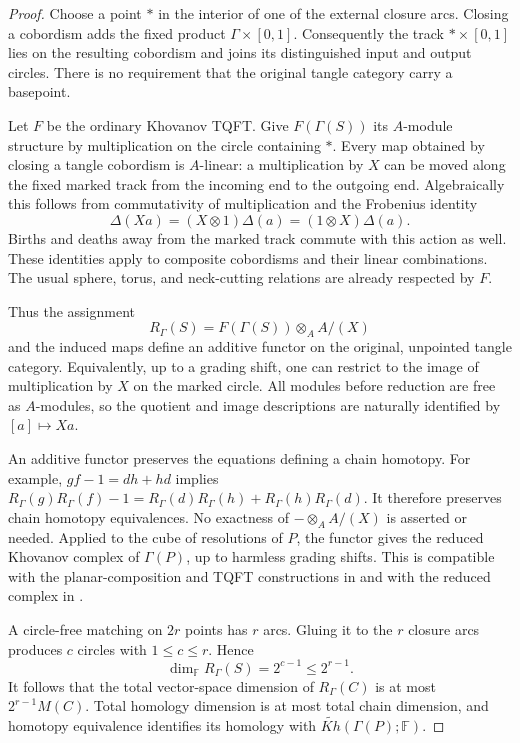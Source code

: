 \documentclass[11pt,a4paper]{article}
\theoremstyle{definition}
\theoremstyle{remark}
\numberwithin{equation}{section}
\begin{document}
\begin{proof}
Choose a point $*$ in the interior of one of the external closure arcs.
Closing a cobordism adds the fixed product $\Gamma\times[0,1]$.
Consequently the track $*\times[0,1]$ lies on the resulting cobordism
and joins its distinguished input and output circles.  There is no
requirement that the original tangle category carry a basepoint.

Let $F$ be the ordinary Khovanov TQFT.  Give $F(\Gamma(S))$ its
$A$-module structure by multiplication on the circle containing $*$.
Every map obtained by closing a tangle cobordism is $A$-linear: a
multiplication by $X$ can be moved along the fixed marked track from the
incoming end to the outgoing end.  Algebraically this follows from
commutativity of multiplication and the Frobenius identity
\[
 \Delta(Xa)=(X\otimes1)\Delta(a)
             =(1\otimes X)\Delta(a).
\]
Births and deaths away from the marked track commute with this action
as well.  These identities apply to composite cobordisms and their
linear combinations.  The usual sphere, torus, and neck-cutting
relations are already respected by $F$.

Thus the assignment
\[
 R_\Gamma(S)=F(\Gamma(S))\otimes_A A/(X)
\]
and the induced maps define an additive functor on the original,
unpointed tangle category.  Equivalently, up to a grading shift, one
can restrict to the image of multiplication by $X$ on the marked
circle.  All modules before reduction are free as $A$-modules, so
the quotient and image descriptions are naturally identified by
\mbox{$[a]\mapsto Xa$}.

An additive functor preserves the equations defining a chain homotopy.
For example, $gf-1=dh+hd$ implies
$R_\Gamma(g)R_\Gamma(f)-1
=R_\Gamma(d)R_\Gamma(h)+R_\Gamma(h)R_\Gamma(d)$.
It therefore preserves chain homotopy equivalences.  No exactness of
$-\otimes_A A/(X)$ is asserted or needed.  Applied to the cube of
resolutions of $P$, the functor gives the reduced Khovanov complex of
$\Gamma(P)$, up to harmless grading shifts.  This is compatible with
the planar-composition and TQFT constructions in
\cite[Theorem~2 and Section~7]{BarNatanTangles} and with the reduced
complex in \cite[Section~3]{KhovanovPatterns}.

A circle-free matching on $2r$ points has $r$ arcs.  Gluing it to the
$r$ closure arcs produces $c$ circles with $1\le c\le r$.
Hence
\[
 \dim_{\mathbb F}R_\Gamma(S)=2^{c-1}\le2^{r-1}.
\]
It follows that the total vector-space dimension of
$R_\Gamma(C)$ is at most $2^{r-1}M(C)$.  Total homology dimension is
at most total chain dimension, and homotopy equivalence identifies
its homology with $\widetilde{Kh}(\Gamma(P);\mathbb F)$.


\end{proof}
\end{document}
